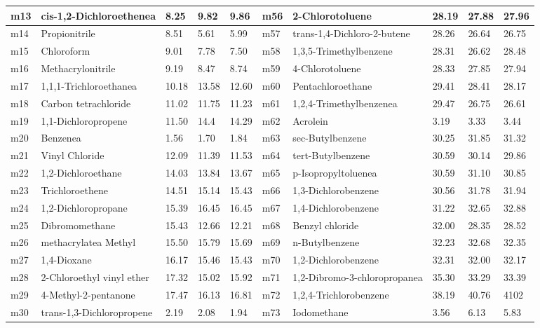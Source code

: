 \documentclass[11pt]{article}
\begin{document}
\begin{table}
{\begin{tabular}{|l|l|l|l|l|l|l|l|l|l|}
\hline
m13 & cis-1,2-Dichloroethenea & 8.25 & 9.82 & 9.86 & m56 & 2-Chlorotoluene & 28.19 & 27.88 & 27.96 \\
\hline
m14 & Propionitrile & 8.51 & 5.61 & 5.99 & m57 & trans-1,4-Dichloro-2-butene & 28.26 & 26.64 & 26.75 \\
\hline
m15 & Chloroform & 9.01 & 7.78 & 7.50 & m58 & 1,3,5-Trimethylbenzene & 28.31 & 26.62 & 28.48 \\
\hline
m16 & Methacrylonitrile & 9.19 & 8.47 & 8.74 & m59 & 4-Chlorotoluene & 28.33 & 27.85 & 27.94 \\
\hline
m17 & 1,1,1-Trichloroethanea & 10.18 & 13.58 & 12.60 & m60 & Pentachloroethane & 29.41 & 28.41 & 28.17 \\
\hline
m18 & Carbon tetrachloride & 11.02 & 11.75 & 11.23 & m61 & 1,2,4-Trimethylbenzenea & 29.47 & 26.75 & 26.61 \\
\hline
m19 & 1,1-Dichloropropene & 11.50 & 14.4 & 14.29 & m62 & Acrolein & 3.19 & 3.33 & 3.44 \\
\hline
m20 & Benzenea & 1.56 & 1.70 & 1.84 & m63 & sec-Butylbenzene & 30.25 & 31.85 & 31.32 \\
\hline
m21 & Vinyl Chloride & 12.09 & 11.39 & 11.53 & m64 & tert-Butylbenzene & 30.59 & 30.14 & 29.86 \\
\hline
m22 & 1,2-Dichloroethane & 14.03 & 13.84 & 13.67 & m65 & p-Isopropyltoluenea & 30.59 & 31.10 & 30.85 \\
\hline
m23 & Trichloroethene & 14.51 & 15.14 & 15.43 & m66 & 1,3-Dichlorobenzene & 30.56 & 31.78 & 31.94 \\
\hline
m24 & 1,2-Dichloropropane & 15.39 & 16.45 & 16.45 & m67 & 1,4-Dichlorobenzene & 31.22 & 32.65 & 32.88 \\
\hline
m25 & Dibromomethane & 15.43 & 12.66 & 12.21 & m68 & Benzyl chloride & 32.00 & 28.35 & 28.52 \\
\hline
m26 & methacrylatea Methyl & 15.50 & 15.79 & 15.69 & m69 & n-Butylbenzene & 32.23 & 32.68 & 32.35 \\
\hline
m27 & 1,4-Dioxane & 16.17 & 15.46 & 15.43 & m70 & 1,2-Dichlorobenzene & 32.31 & 32.00 & 32.17 \\
\hline
m28 & 2-Chloroethyl vinyl ether & 17.32 & 15.02 & 15.92 & m71 & 1,2-Dibromo-3-chloropropanea & 35.30 & 33.29 & 33.39 \\
\hline
m29 & 4-Methyl-2-pentanone & 17.47 & 16.13 & 16.81 & m72 & 1,2,4-Trichlorobenzene & 38.19 & 40.76 & 4102 \\
\hline
m30 & trans-1,3-Dichloropropene & 2.19 & 2.08 & 1.94 & m73 & Iodomethane & 3.56 & 6.13 & 5.83 \\

\end{tabular}}
\end{table}
\end{document}
